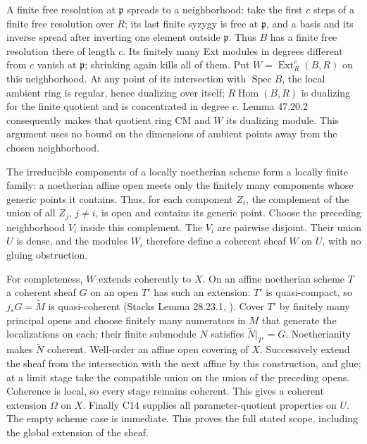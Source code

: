 \documentclass[11pt]{article}
\newcommand{\Hom}{\operatorname{Hom}}
\newcommand{\Ext}{\operatorname{Ext}}
\begin{document}
A finite free resolution at $\mathfrak p$ spreads to a neighborhood:
take the first $c$ steps of a finite free resolution over $R$; its
last finite syzygy is free at $\mathfrak p$, and a basis and its inverse
spread after inverting one element outside $\mathfrak p$. Thus $B$
has a finite free resolution there of length $c$. Its finitely many
Ext modules in degrees different from $c$ vanish at $\mathfrak p$;
shrinking again kills all of them. Put $W=\Ext^c_R(B,R)$ on this
neighborhood. At any point of its intersection with $\operatorname{Spec}B$,
the local ambient ring is regular, hence dualizing over itself;
$R\Hom(B,R)$ is dualizing for the finite quotient and is concentrated
in degree $c$. Lemma 47.20.2 consequently makes that quotient ring
CM and $W$ its dualizing module. This argument uses no bound on the
dimensions of ambient points away from the chosen neighborhood.

The irreducible components of a locally noetherian scheme form a
locally finite family: a noetherian affine open meets only the finitely
many components whose generic points it contains. Thus, for each
component $Z_i$, the complement of the union of all $Z_j$, $j\ne i$,
is open and contains its generic point. Choose the preceding
neighborhood $V_i$ inside this complement. The $V_i$ are pairwise
disjoint. Their union $U$ is dense, and the modules $W_i$ therefore
define a coherent sheaf $W$ on $U$, with no gluing obstruction.

For completeness, $W$ extends coherently to $X$. On an affine
noetherian scheme $T$ a coherent sheaf $G$ on an open $T'$ has such
an extension: $T'$ is quasi-compact, so $j_*G=\widetilde M$ is
quasi-coherent (Stacks Lemma 28.23.1, \cite{StacksSheafExtension}). Cover $T'$ by finitely many
principal opens and choose finitely many numerators in $M$ that
generate the localizations on each; their finite submodule $N$
satisfies $\widetilde N|_{T'}=G$. Noetherianity makes $\widetilde N$
coherent. Well-order an affine open covering of $X$. Successively
extend the sheaf from the intersection with the next affine by this
construction, and glue; at a limit stage take the compatible union
on the union of the preceding opens. Coherence is local, so every
stage remains coherent. This gives a coherent extension $\Omega$
on $X$. Finally C14 supplies all parameter-quotient properties on
$U$. The empty scheme case is immediate. This proves the full stated
scope, including the global extension of the sheaf.
\end{document}
